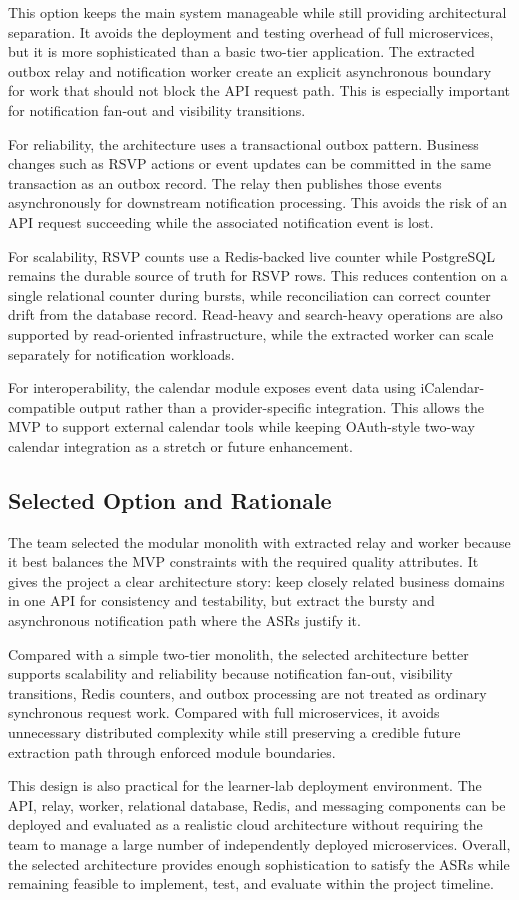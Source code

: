 This option keeps the main system manageable while still providing architectural separation. It avoids the deployment and testing overhead of full microservices, but it is more sophisticated than a basic two-tier application. The extracted outbox relay and notification worker create an explicit asynchronous boundary for work that should not block the API request path. This is especially important for notification fan-out and visibility transitions.

For reliability, the architecture uses a transactional outbox pattern. Business changes such as RSVP actions or event updates can be committed in the same transaction as an outbox record. The relay then publishes those events asynchronously for downstream notification processing. This avoids the risk of an API request succeeding while the associated notification event is lost.

For scalability, RSVP counts use a Redis-backed live counter while PostgreSQL remains the durable source of truth for RSVP rows. This reduces contention on a single relational counter during bursts, while reconciliation can correct counter drift from the database record. Read-heavy and search-heavy operations are also supported by read-oriented infrastructure, while the extracted worker can scale separately for notification workloads.

For interoperability, the calendar module exposes event data using iCalendar-compatible output rather than a provider-specific integration. This allows the MVP to support external calendar tools while keeping OAuth-style two-way calendar integration as a stretch or future enhancement.

\subsection{Selected Option and Rationale}

The team selected the modular monolith with extracted relay and worker because it best balances the MVP constraints with the required quality attributes. It gives the project a clear architecture story: keep closely related business domains in one API for consistency and testability, but extract the bursty and asynchronous notification path where the ASRs justify it.

Compared with a simple two-tier monolith, the selected architecture better supports scalability and reliability because notification fan-out, visibility transitions, Redis counters, and outbox processing are not treated as ordinary synchronous request work. Compared with full microservices, it avoids unnecessary distributed complexity while still preserving a credible future extraction path through enforced module boundaries.

This design is also practical for the learner-lab deployment environment. The API, relay, worker, relational database, Redis, and messaging components can be deployed and evaluated as a realistic cloud architecture without requiring the team to manage a large number of independently deployed microservices. Overall, the selected architecture provides enough sophistication to satisfy the ASRs while remaining feasible to implement, test, and evaluate within the project timeline.
